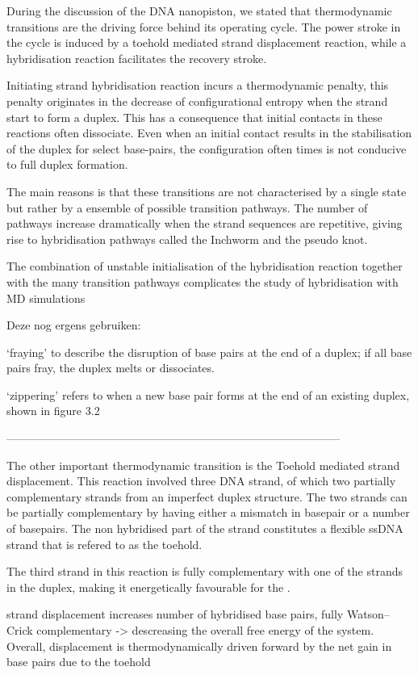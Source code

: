 During the discussion of the DNA nanopiston, we stated that thermodynamic transitions are
the driving force behind its operating cycle. The power stroke in the cycle is induced by
a toehold mediated strand displacement reaction, while a hybridisation reaction
facilitates the recovery stroke.


Initiating strand hybridisation reaction incurs a thermodynamic penalty, this penalty
originates in the decrease of configurational entropy when the strand start to form a
duplex. This has a consequence that initial contacts in these reactions often dissociate.
Even when an initial contact results in the stabilisation of the duplex for select
base-pairs, the configuration often times is not conducive to full duplex formation.

The main reasons is that these transitions are not characterised by a single state but
rather by a ensemble of possible transition pathways. The number of pathways increase
dramatically when the strand sequences are repetitive, giving rise to hybridisation
pathways called the Inchworm and the pseudo knot.

The combination of  unstable initialisation of the hybridisation reaction together with
the many transition pathways complicates the study of hybridisation with MD simulations

Deze nog ergens gebruiken:

‘fraying’ to describe the disruption of base pairs at the end of a duplex; if all base
pairs fray, the duplex melts or dissociates.

‘zippering’ refers to when a new base pair forms at the end of an existing duplex, shown
in figure 3.2

-----------------------------------------------------------------------------------------

The other important thermodynamic transition is the Toehold mediated strand displacement.
This reaction involved three DNA strand, of which two partially complementary strands
from an imperfect duplex structure. The two strands can be partially complementary by
having either a mismatch in basepair or a number of basepairs. The non hybridised part of
the strand constitutes a flexible ssDNA strand that is refered to as the toehold.

The third strand in this reaction is fully complementary with one of the strands in the
duplex, making it energetically favourable for the .

strand displacement increases number of hybridised base pairs, fully Watson–Crick
complementary -> descreasing the overall free energy of the system. Overall, displacement
is thermodynamically driven forward by the net gain in base pairs due to the toehold


